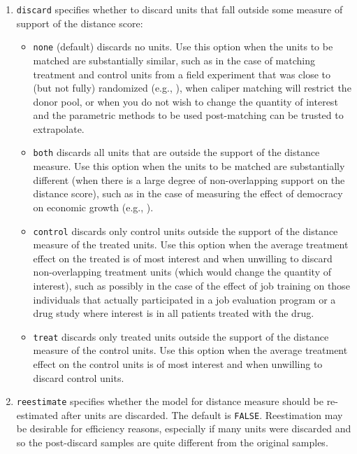 \documentclass[oneside,letterpaper,titlepage]{article}
\begin{document}
\begin{enumerate}
\item \texttt{discard} specifies whether to discard units that fall
  outside some measure of support of the distance score:
  \begin{itemize}
  \item \texttt{none} (default) discards no units.  Use this option
    when the units to be matched are substantially similar, such as in
    the case of matching treatment and control units from a field
    experiment that was close to (but not fully) randomized (e.g.,
    \citealt{Imai05}), when caliper matching will restrict the donor
    pool, or when you do not wish to change the quantity of interest
    and the parametric methods to be used post-matching can be trusted
    to extrapolate.
  \item \texttt{both} discards all units that are outside the support
    of the distance measure.  Use this option when the units to be
    matched are substantially different (when there is a large degree
    of non-overlapping support on the distance score), such as in the
    case of measuring the effect of democracy on economic growth
    (e.g., \citealt{KinZen04}).
  \item \texttt{control} discards only control units outside the
    support of the distance measure of the treated units.  Use this
    option when the average treatment effect on the treated is of most
    interest and when unwilling to discard non-overlapping treatment
    units (which would change the quantity of interest), such as
    possibly in the case of the effect of job training on those
    individuals that actually participated in a job evaluation program
    or a drug study where interest is in all patients treated with the
    drug.
  \item \texttt{treat} discards only treated units outside the support
    of the distance measure of the control units.  Use this option
    when the average treatment effect on the control units is of most
    interest and when unwilling to discard control units.
  \end{itemize}
  
\item \texttt{reestimate} specifies whether the model for distance
  measure should be re-estimated after units are discarded. The
  default is \texttt{FALSE}.  Reestimation may be desirable for efficiency
  reasons, especially if many units were discarded and so the
  post-discard samples are quite different from the original samples.
\end{enumerate}
\end{document}
